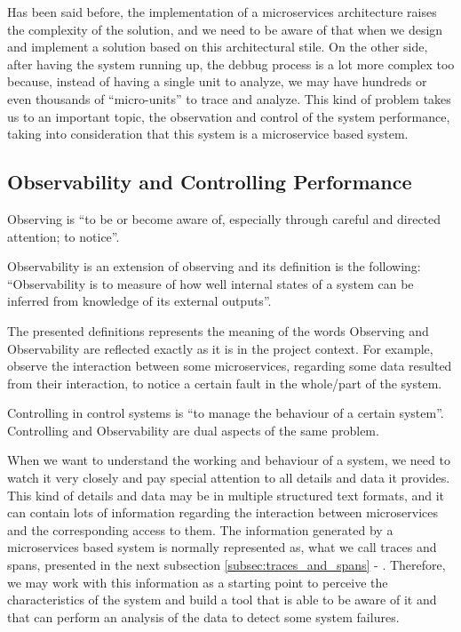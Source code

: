 Has been said before, the implementation of a microservices architecture raises the complexity of the solution, and we need to be aware of that when we design and implement a solution based on this architectural stile. On the other side, after having the system running up, the debbug process is a lot more complex too because, instead of having a single unit to analyze, we may have hundreds or even thousands of ``micro-units'' to trace and analyze. This kind of problem takes us to an important topic, the observation and control of the system performance, taking into consideration that this system is a microservice based system.

\subsection{Observability and Controlling Performance}
\label{subsec:observability_and_controlling_performance}

Observing is ``to be or become aware of, especially through careful and directed attention; to notice''\cite{observing_definition}.

Observability is an extension of observing and its definition is the following: ``Observability is to measure of how well internal states of a system can be inferred from knowledge of its external outputs''\cite{observability}.

The presented definitions represents the meaning of the words Observing and Observability are reflected exactly as it is in the project context. For example, observe the interaction between some microservices, regarding some data resulted from their interaction, to notice a certain fault in the whole/part of the system.

Controlling in control systems is ``to manage the behaviour of a certain system''\cite{control_systems}. Controlling and Observability are dual aspects of the same problem\cite{observability}.

When we want to understand the working and behaviour of a system, we need to watch it very closely and pay special attention to all details and data it provides. This kind of details and data may be in multiple structured text formats, and it can contain lots of information regarding the interaction between microservices and the corresponding access to them. The information generated by a microservices based system is normally represented as, what we call traces and spans, presented in the next subsection \ref{subsec:traces_and_spans} - . Therefore, we may work with this information as a starting point to perceive the characteristics of the system and build a tool that is able to be aware of it and that can perform an analysis of the data to detect some system failures.

